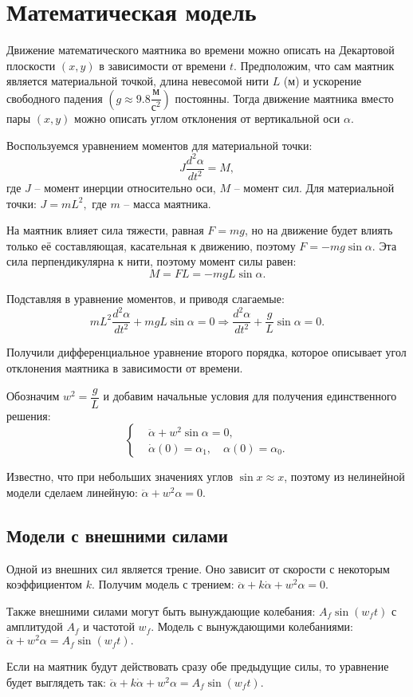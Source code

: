 \section{Математическая модель}
    Движение математического маятника во времени можно описать на Декартовой плоскости $ (x, y) $ в зависимости от времени \( t \). Предположим, что сам маятник является материальной точкой, длина невесомой нити \( L \) (м) и ускорение свободного падения \(\left( g \approx 9.8 \dfrac{\text{м}}{\text{с}^2} \right) \) постоянны. Тогда движение маятника вместо пары \((x, y) \) можно описать углом отклонения от вертикальной оси \( \alpha \).

    Воспользуемся уравнением моментов для материальной точки:
    \[
        J \dfrac{d^2 \alpha}{dt^2} = M,
    \]
    где $ J $ -- момент инерции относительно оси, $ M $ -- момент сил. Для материальной точки: \( J = mL^2, \) где $ m $ -- масса маятника. 

    На маятник влияет сила тяжести, равная \( F = mg \), но на движение будет влиять только её составляющая, касательная к движению, поэтому \( F = -mg \sin \alpha \). Эта сила перпендикулярна к нити, поэтому момент силы равен:
    \[
        M = FL = - mgL \sin \alpha.
    \]

    Подставляя в уравнение моментов, и приводя слагаемые:
    \[
        mL^2 \dfrac{d^2 \alpha}{dt^2} + mgL \sin \alpha = 0 \Rightarrow \dfrac{d^2 \alpha}{dt^2} + \dfrac{g}{L} \sin \alpha = 0.
    \]

    Получили дифференциальное уравнение второго порядка, которое описывает угол отклонения маятника в зависимости от времени.
    
    Обозначим \( w^2 = \dfrac{g}{L} \) и добавим начальные условия для получения единственного решения:
    \[
        \begin{cases}
            & \ddot{\alpha} + w^2 \sin \alpha = 0, \\
            & \dot{\alpha}(0) = \alpha_1, \quad \alpha(0) = \alpha_0.
        \end{cases}
    \]
    
    Известно, что при небольших значениях углов \( \sin x \approx x \), поэтому из нелинейной модели сделаем линейную: \( \ddot{\alpha} + w^2 \alpha = 0. \)

    \subsection{Модели с внешними силами}
        Одной из внешних сил является трение. Оно зависит от скорости с некоторым коэффициентом $ k $. Получим модель с трением: \( \ddot{\alpha} + k \dot{\alpha} + w^2 \alpha = 0. \)

        Также внешними силами могут быть вынуждающие колебания: \( A_f \sin \left( w_f t \right) \) с амплитудой \( A_f \) и частотой \( w_f \). Модель с вынуждающими колебаниями:\\ \( \ddot{\alpha} + w^2 \alpha = A_f \sin \left( w_f t \right). \)

        Если на маятник будут действовать сразу обе предыдущие силы, то уравнение будет выглядеть так: \( \ddot{\alpha}  + k \dot{\alpha} + w^2 \alpha = A_f \sin \left( w_f t \right). \)